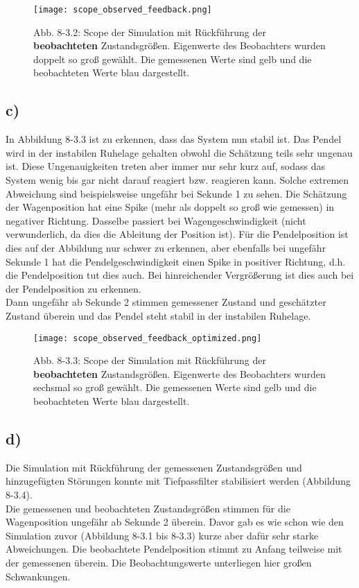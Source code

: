 \documentclass[11pt]{scrartcl} %
\begin{document}
\begin{figure}[H]
\centering
\texttt{[image: scope\_observed\_feedback.png]}
\captionsetup{labelformat=empty}
\caption{Abb. 8-3.2: Scope der Simulation mit Rückführung der \textbf{beobachteten} Zustandsgrößen. Eigenwerte des Beobachters wurden doppelt so groß gewählt. Die gemessenen Werte sind gelb und die beobachteten Werte blau dargestellt.}
\end{figure}

\subsection*{c)}
In Abbildung 8-3.3 ist zu erkennen, dass das System nun stabil ist. Das Pendel wird in der instabilen Ruhelage gehalten obwohl die Schätzung teils sehr ungenau ist. Diese Ungenauigkeiten treten aber immer nur sehr kurz auf, sodass das System wenig bis gar nicht darauf reagiert bzw. reagieren kann. Solche extremen Abweichung sind beispielsweise ungefähr bei Sekunde 1 zu sehen. Die Schätzung der Wagenposition hat eine Spike (mehr als doppelt so groß wie gemessen) in negativer Richtung. Dasselbe passiert bei Wagengeschwindigkeit (nicht verwunderlich, da dies die Ableitung der Position ist). Für die Pendelposition ist dies auf der Abbildung nur schwer zu erkennen, aber ebenfalls bei ungefähr Sekunde 1 hat die Pendelgeschwindigkeit einen Spike in positiver Richtung, d.h. die Pendelposition tut dies auch. Bei hinreichender Vergrößerung ist dies auch bei der Pendelposition zu erkennen.\\
Dann ungefähr ab Sekunde 2 stimmen gemessener Zustand und geschätzter Zustand überein und das Pendel steht stabil in der instabilen Ruhelage.

\begin{figure}[H]
\centering
\texttt{[image: scope\_observed\_feedback\_optimized.png]}
\captionsetup{labelformat=empty}
\caption{Abb. 8-3.3: Scope der Simulation mit Rückführung der \textbf{beobachteten} Zustandsgrößen. Eigenwerte des Beobachters wurden sechsmal so groß gewählt. Die gemessenen Werte sind gelb und die beobachteten Werte blau dargestellt.}
\end{figure}

\subsection*{d)}

Die Simulation mit Rückführung der gemessenen Zustandsgrößen und hinzugefügten Störungen konnte mit Tiefpassfilter stabilisiert werden (Abbildung 8-3.4).\\
Die gemessenen und beobachteten Zustandsgrößen stimmen für die Wagenposition ungefähr ab Sekunde 2 überein. Davor gab es wie schon wie den Simulation zuvor (Abbildung 8-3.1 bis 8-3.3) kurze aber dafür sehr starke Abweichungen. Die beobachtete Pendelposition stimmt zu Anfang teilweise mit der gemessenen überein. Die Beobachtungswerte unterliegen hier großen Schwankungen.\\
\end{document}
